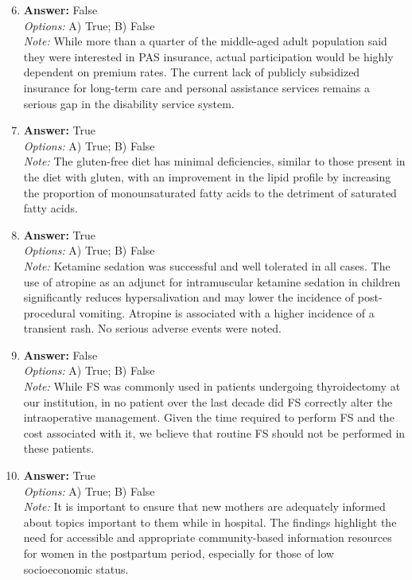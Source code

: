 \documentclass[12pt]{article}
\begin{document}
\begin{enumerate}[label=\arabic*.]
\setcounter{enumi}{5}
\item \textbf{Answer:} False
\\ \textit{Options:} A) True; B) False
\\ \textit{Note:} While more than a quarter of the middle-aged adult population said they were interested in PAS insurance, actual participation would be highly dependent on premium rates. The current lack of publicly subsidized insurance for long-term care and personal assistance services remains a serious gap in the disability service system.
\item \textbf{Answer:} True
\\ \textit{Options:} A) True; B) False
\\ \textit{Note:} The gluten-free diet has minimal deficiencies, similar to those present in the diet with gluten, with an improvement in the lipid profile by increasing the proportion of monounsaturated fatty acids to the detriment of saturated fatty acids.
\item \textbf{Answer:} True
\\ \textit{Options:} A) True; B) False
\\ \textit{Note:} Ketamine sedation was successful and well tolerated in all cases. The use of atropine as an adjunct for intramuscular ketamine sedation in children significantly reduces hypersalivation and may lower the incidence of post-procedural vomiting. Atropine is associated with a higher incidence of a transient rash. No serious adverse events were noted.
\item \textbf{Answer:} False
\\ \textit{Options:} A) True; B) False
\\ \textit{Note:} While FS was commonly used in patients undergoing thyroidectomy at our institution, in no patient over the last decade did FS correctly alter the intraoperative management. Given the time required to perform FS and the cost associated with it, we believe that routine FS should not be performed in these patients.
\item \textbf{Answer:} True
\\ \textit{Options:} A) True; B) False
\\ \textit{Note:} It is important to ensure that new mothers are adequately informed about topics important to them while in hospital. The findings highlight the need for accessible and appropriate community-based information resources for women in the postpartum period, especially for those of low socioeconomic status.
\end{enumerate}
\end{document}
